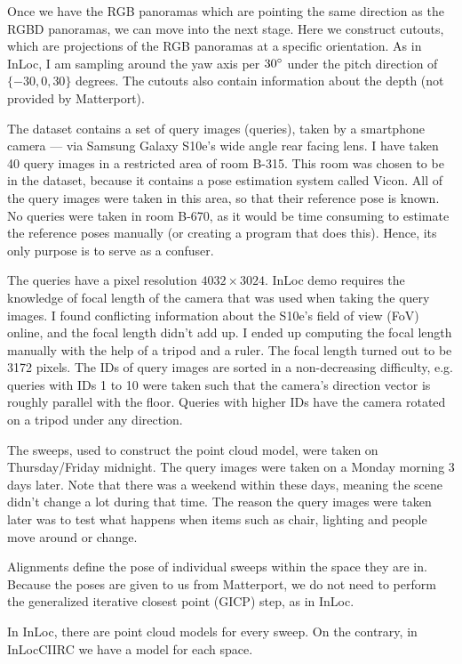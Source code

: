 \documentclass[twoside]{ctuthesis}
\theoremstyle{plain}
\theoremstyle{definition}
\theoremstyle{note}
\begin{document}
Once we have the RGB panoramas which are pointing the same direction as the RGBD panoramas, we can move into the next stage. Here we construct cutouts, which are projections of the RGB panoramas at a specific orientation. As in InLoc, I am sampling around the yaw axis per $30\degree$ under the pitch direction of $\{-30, 0, 30\}$ degrees. The cutouts also contain information about the depth (not provided by Matterport).

The dataset contains a set of query images (queries), taken by a smartphone camera --- via Samsung Galaxy S10e's wide angle rear facing lens. I have taken 40 query images in a restricted area of room B-315. This room was chosen to be in the dataset, because it contains a pose estimation system called Vicon. All of the query images were taken in this area, so that their reference pose is known. No queries were taken in room B-670, as it would be time consuming to estimate the reference poses manually (or creating a program that does this). Hence, its only purpose is to serve as a confuser.

The queries have a pixel resolution $4032 \times 3024$. InLoc demo requires the knowledge of focal length of the camera that was used when taking the query images. I found conflicting information about the S10e's field of view (FoV) online, and the focal length didn't add up. I ended up computing the focal length manually with the help of a tripod and a ruler. The focal length turned out to be 3172 pixels. The IDs of query images are sorted in a non-decreasing difficulty, e.g. queries with IDs 1 to 10 were taken such that the camera's direction vector is roughly parallel with the floor. Queries with higher IDs have the camera rotated on a tripod under any direction.

The sweeps, used to construct the point cloud model, were taken on Thursday/Friday midnight. The query images were taken on a Monday morning 3 days later. Note that there was a weekend within these days, meaning the scene didn't change a lot during that time. The reason the query images were taken later was to test what happens when items such as chair, lighting and people move around or change.

Alignments define the pose of individual sweeps within the space they are in. Because the poses are given to us from Matterport, we do not need to perform the generalized iterative closest point (GICP) step, as in InLoc.

In InLoc, there are point cloud models for every sweep. On the contrary, in InLocCIIRC we have a model for each space.
\end{document}
